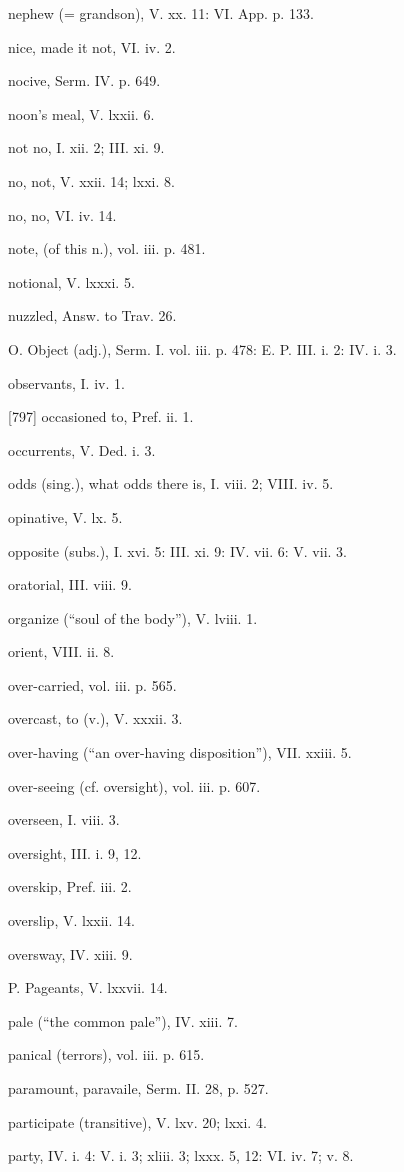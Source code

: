 nephew (= grandson), V. xx. 11: VI. App. p. 133.

nice, made it not, VI. iv. 2.

nocive, Serm. IV. p. 649.

noon’s meal, V. lxxii. 6.

not no, I. xii. 2; III. xi. 9.

no, not, V. xxii. 14; lxxi. 8.

no, no, VI. iv. 14.

note, (of this n.), vol. iii. p. 481.

notional, V. lxxxi. 5.

nuzzled, Answ. to Trav. 26.

O.
Object (adj.), Serm. I. vol. iii. p. 478: E. P. III. i. 2: IV. i. 3.

observants, I. iv. 1.

[797]
occasioned to, Pref. ii. 1.

occurrents, V. Ded. i. 3.

odds (sing.), what odds there is, I. viii. 2; VIII. iv. 5.

opinative, V. lx. 5.

opposite (subs.), I. xvi. 5: III. xi. 9: IV. vii. 6: V. vii. 3.

oratorial, III. viii. 9.

organize (“soul of the body”), V. lviii. 1.

orient, VIII. ii. 8.

over-carried, vol. iii. p. 565.

overcast, to (v.), V. xxxii. 3.

over-having (“an over-having disposition”), VII. xxiii. 5.

over-seeing (cf. oversight), vol. iii. p. 607.

overseen, I. viii. 3.

oversight, III. i. 9, 12.

overskip, Pref. iii. 2.

overslip, V. lxxii. 14.

oversway, IV. xiii. 9.

P.
Pageants, V. lxxvii. 14.

pale (“the common pale”), IV. xiii. 7.

panical (terrors), vol. iii. p. 615.

paramount, paravaile, Serm. II. 28, p. 527.

participate (transitive), V. lxv. 20; lxxi. 4.

party, IV. i. 4: V. i. 3; xliii. 3; lxxx. 5, 12: VI. iv. 7; v. 8.

